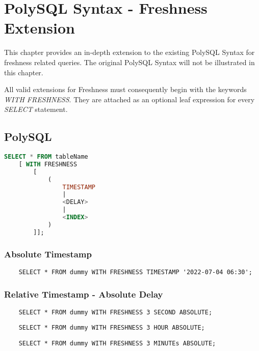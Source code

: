 \chapter{PolySQL Syntax - Freshness Extension}
This chapter provides an in-depth extension to the existing PolySQL Syntax for freshness related queries.
The original PolySQL Syntax will not be illustrated in this chapter.

All valid extensions for Freshness must consequently begin with the keywords \emph{WITH FRESHNESS}.
They are attached as an optional leaf expression for every \emph{SELECT} statement.

\tocless\section{PolySQL}


\begin{lstlisting}[language=sql]
    SELECT * FROM tableName 
    [ WITH FRESHNESS 
        [ 
            ( 
                TIMESTAMP 
                | 
                <DELAY> 
                | 
                <INDEX> 
            )   
        ]];
\end{lstlisting}

\tocless\subsection{Absolute Timestamp}

\begin{verbatim}
    SELECT * FROM dummy WITH FRESHNESS TIMESTAMP '2022-07-04 06:30';
\end{verbatim}


\tocless\subsection{Relative Timestamp - Absolute Delay}

\begin{verbatim}
    SELECT * FROM dummy WITH FRESHNESS 3 SECOND ABSOLUTE;
\end{verbatim}

\begin{verbatim}
    SELECT * FROM dummy WITH FRESHNESS 3 HOUR ABSOLUTE;
\end{verbatim}

\begin{verbatim}
    SELECT * FROM dummy WITH FRESHNESS 3 MINUTEs ABSOLUTE;
\end{verbatim}

